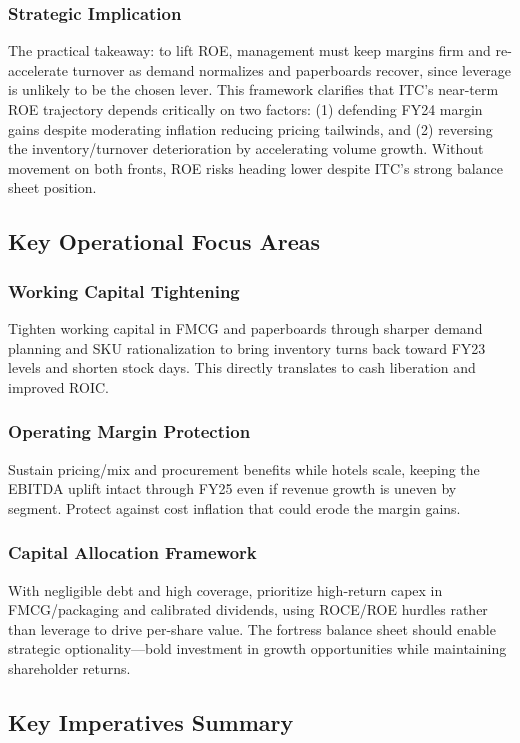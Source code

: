 \documentclass[12pt, a4paper]{report}
\begin{document}
\subsubsection{Strategic Implication}
The practical takeaway: to lift ROE, management must keep margins firm and re-accelerate turnover as demand normalizes and paperboards recover, since leverage is unlikely to be the chosen lever. This framework clarifies that ITC's near-term ROE trajectory depends critically on two factors: (1) defending FY24 margin gains despite moderating inflation reducing pricing tailwinds, and (2) reversing the inventory/turnover deterioration by accelerating volume growth. Without movement on both fronts, ROE risks heading lower despite ITC's strong balance sheet position.

\subsection{Key Operational Focus Areas}

\subsubsection{Working Capital Tightening}
Tighten working capital in FMCG and paperboards through sharper demand planning and SKU rationalization to bring inventory turns back toward FY23 levels and shorten stock days. This directly translates to cash liberation and improved ROIC.

\subsubsection{Operating Margin Protection}
Sustain pricing/mix and procurement benefits while hotels scale, keeping the EBITDA uplift intact through FY25 even if revenue growth is uneven by segment. Protect against cost inflation that could erode the margin gains.

\subsubsection{Capital Allocation Framework}
With negligible debt and high coverage, prioritize high-return capex in FMCG/packaging and calibrated dividends, using ROCE/ROE hurdles rather than leverage to drive per-share value. The fortress balance sheet should enable strategic optionality—bold investment in growth opportunities while maintaining shareholder returns.

\subsection{Key Imperatives Summary}
\end{document}

